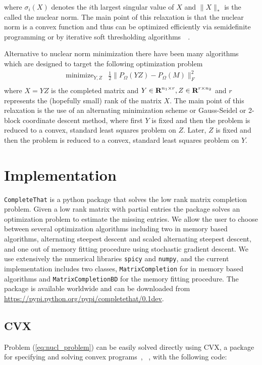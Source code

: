 \documentclass[12pt]{article}
\begin{document}
where $\sigma_i(X)$ denotes the $i$th largest singular value of $X$ and $\|X\|_*$ is the called the nuclear norm. The main point of this relaxation is that the nuclear norm is a convex function and thus can be optimized efficiently via semidefinite programming or by iterative soft thresholding algorithms~\cite{cai:2010}~\cite{goldfarb:2011}.

Alternative to nuclear norm minimization there have been many algorithms which are designed to target the following optimization problem
\begin{equation}
    \begin{array}{ll}
    \mbox{minimize}_{Y,Z}   & \frac{1}{2} \|P_{\Omega}(YZ) - P_{\Omega}(M)\|^2_F \\
    \end{array}
    \label{eq:frob_problem}
\end{equation}
where $X=YZ$ is the completed matrix and $Y\in {\mbox{\bf R}}^{n_1\times r}, Z\in {\mbox{\bf R}}^{r\times n_2}$ and $r$ represents the (hopefully small) rank of the matrix $X$. The main point of this relaxation is the use of an alternating minimization scheme or Gauss-Seidel or 2-block coordinate descent method, where first $Y$ is fixed and then the problem is reduced to a convex, standard least squares problem on $Z$. Later, $Z$ is fixed and then the problem is reduced to a convex, standard least squares problem on $Y$.

\section{Implementation}
\texttt{CompleteThat} is a python package that solves the low rank matrix completion problem. Given a low rank matrix with partial entries the package solves an optimization problem to estimate the missing entries. We allow the user to choose between several optimization algorithms including two in memory based algorithms, alternating steepest descent and scaled alternating steepest descent, and one out of memory fitting procedure using stochastic gradient descent. We use extensively the numerical libraries \texttt{spicy} and \texttt{numpy}, and the current implementation includes two classes, \texttt{MatrixCompletion} for in memory based algorithms and \texttt{MatrixCompletionBD} for the memory fitting procedure. The package is available worldwide and can be
downloaded from \url{https://pypi.python.org/pypi/completethat/0.1dev}.

\subsection*{CVX}
Problem (\ref{eq:nucl_problem}) can be easily solved directly using CVX, a package for specifying and solving convex programs~\cite{cvx}, ~\cite{gb08}, with the following code:
\end{document}
